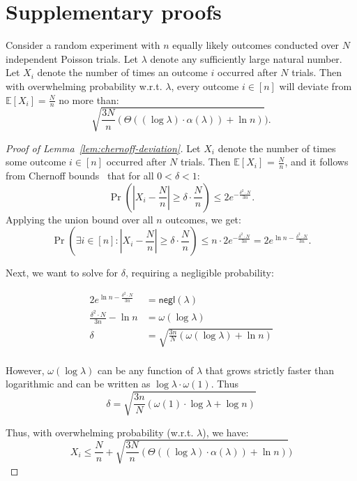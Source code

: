 \clearpage
%
%

 

\appendix 

\clearpage

\section{Supplementary proofs} \label{sec:proofs}


\begin{lemma} \label{lem:chernoff-deviation} Consider a random experiment with $n$ equally likely outcomes conducted over $N$ independent Poisson trials. Let $\lambda$ denote any sufficiently large natural number. Let $X_i$ denote the number of times an outcome $i$ occurred after $N$ trials. Then with overwhelming probability w.r.t. $\lambda$, every outcome $i \in [n]$ will deviate from $\mathbb{E}[X_i] = \frac{N}{n}$ no more than:
$$ 
\sqrt{\frac{3N}{n}(\Theta((\log \lambda) \cdot \alpha(\lambda)) + \ln n)}).
$$
\end{lemma} 

\begin{proof}[Proof of Lemma~\ref{lem:chernoff-deviation}]

Let $X_i$ denote the number of times some outcome $i \in [n]$ occurred after $N$ trials. Then $\mathbb{E}[X_i]$ = $\frac{N}{n}$, and it follows from Chernoff bounds~\cite[Cor.~4.6]{MU05} that for all $0 < \delta < 1$:
$$
\Pr\left(|X_i - \frac{N}{n}| \geq \delta \cdot \frac{N}{n} \right) \leq 2 e^{-\frac{\delta^2 \cdot N}{3n}}.
$$
Applying the union bound over all $n$ outcomes, we get:
$$
\Pr\left(\exists i \in [n]: |X_i - \frac{N}{n}| \geq \delta \cdot \frac{N}{n} \right) \leq n \cdot 2 e^{-\frac{\delta^2 \cdot N}{3n}} = 2 e^{\ln n -\frac{\delta^2 \cdot N}{3n}}.
$$

Next, we want to solve for $\delta$, requiring a negligible probability:

\begin{align*}
2 e^{\ln n -\frac{\delta^2 \cdot N}{3n}} &= \mathsf{negl}(\lambda)\\
\frac{\delta^2 \cdot N}{3n} - \ln n &= \omega(\log \lambda)\\
\delta &= \sqrt{\frac{3n}{N}(\omega(\log \lambda) + \ln n)}\\
\end{align*}

However, $\omega(\log \lambda)$ can be any function of \(\lambda\) that grows strictly faster than logarithmic and can be written as $\log \lambda \cdot \omega(1)$. Thus
$$
\delta = \sqrt{\frac{3n}{N} (\omega(1) \cdot \log \lambda + \log n)}
$$

Thus, with overwhelming probability (w.r.t. $\lambda$), we have:
$$
X_i \leq \frac{N}{n} + \sqrt{\frac{3N}{n}(\Theta((\log \lambda) \cdot \alpha(\lambda)) + \ln n)})
$$

\end{proof}

